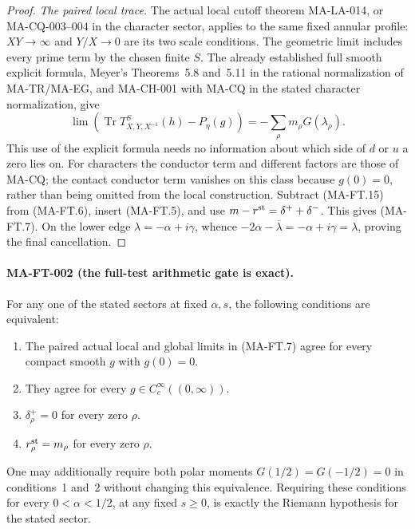 \begin{proof}
\emph{The paired local trace.}
The actual local cutoff theorem MA-LA-014, or MA-CQ-003--004
in the character sector, applies to the same fixed
annular profile: $XY\to\infty$ and $Y/X\to0$ are its
two scale conditions.  The geometric limit includes
every prime term by the chosen finite $S$.
The already established full smooth explicit formula,
Meyer's Theorems~5.8 and~5.11 in the rational normalization
of MA-TR/MA-EG, and MA-CH-001 with MA-CQ in the stated
character normalization, give
\[
 \lim\left(\operatorname{Tr}T^S_{X,Y,X^{-1}}(h)
                                -P_\eta(g)\right)
           =-\sum_\rho m_\rho G(\lambda_\rho).
 \tag{MA-FT.15}
\]
This use of the explicit formula needs no information
about which side of $d$ or $u$ a zero lies on.
For characters the conductor term and different factors
are those of MA-CQ; the contact conductor term vanishes
on this class because $g(0)=0$, rather than being omitted
from the local construction.
Subtract (MA-FT.15) from (MA-FT.6), insert (MA-FT.5),
and use $m-r^{\rm st}=\delta^++\delta^-$.
This gives (MA-FT.7).  On the lower edge
$\lambda=-\alpha+i\gamma$, whence
$-2\alpha-\overline\lambda=-\alpha+i\gamma=\lambda$,
proving the final cancellation.
\end{proof}

\paragraph{MA-FT-002 (the full-test arithmetic gate is exact).}
For any one of the stated sectors at fixed $\alpha,s$,
the following conditions are equivalent:
\begin{enumerate}
\item The paired actual local and global limits in
(MA-FT.7) agree for every compact smooth $g$ with $g(0)=0$.
\item They agree for every $g\in C_c^\infty((0,\infty))$.
\item $\delta_\rho^+=0$ for every zero $\rho$.
\item $r_\rho^{\rm st}=m_\rho$ for every zero $\rho$.
\end{enumerate}
One may additionally require both polar moments
$G(1/2)=G(-1/2)=0$ in conditions~1 and~2 without
changing this equivalence.  Requiring these conditions
for every $0<\alpha<1/2$, at any fixed $s\ge0$,
is exactly the Riemann hypothesis for the stated sector.

